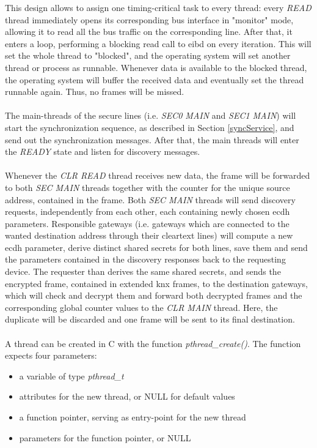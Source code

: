 This design allows to assign one timing-critical task to every thread: every \textit{READ} thread immediately opens its corresponding bus interface in "monitor" mode, allowing it
to read all the bus traffic on the corresponding line. After that, it enters a loop, performing a blocking read call to \gls{eibd} on every iteration.
This will set the whole thread to "blocked", and the operating
system will set another thread or process as runnable. Whenever data is available to the blocked thread, the operating system will buffer the received data and eventually set the
thread runnable again. Thus, no frames will be missed.
\\
\\
The main-threads of the secure lines (i.e. \textit{SEC0 MAIN} and \textit{SEC1 MAIN}) will start the synchronization sequence, as described in Section \ref{syncService}, and send out
the synchronization messages. After  that, the main threads will enter the \textit{READY} state and listen for discovery messages.
\\
\\
Whenever the \textit{CLR READ} thread receives new data, the frame will be forwarded to both \textit{SEC MAIN} threads together with the counter for the unique source address, contained
in the frame. Both \textit{SEC MAIN} threads will send discovery requests, independently from each other, each containing newly chosen \gls{ecdh} parameters. Responsible gateways (i.e.
gateways which are connected to the wanted destination address through their cleartext lines) will compute a new \gls{ecdh} parameter, derive distinct shared secrets for both lines,
save them and send the parameters contained in the discovery responses back to the requesting device. The requester than derives the same shared secrets, and sends the encrypted frame,
contained in extended \gls{knx} frames, to the destination gateways, which will check and decrypt them and forward both decrypted frames and the corresponding global counter values
to the \textit{CLR MAIN} thread. Here, the duplicate will be discarded and one frame will be sent to its final destination.
\\
\\
A thread can be created in C with the function \textit{pthread\_create()}. The function expects four parameters:
\begin{itemize}
 \item a variable of type \textit{pthread\_t}
 \item attributes for the new thread, or NULL for default values
 \item a function pointer, serving as entry-point for the new thread
 \item parameters for the function pointer, or NULL
\end{itemize}
